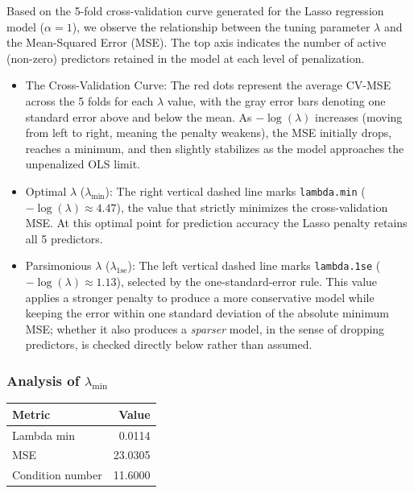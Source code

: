 \documentclass[
  11pt,
]{article}
\newcounter{none} %
\begin{document}
Based on the 5-fold cross-validation curve generated for the Lasso
regression model (\(\alpha = 1\)), we observe the relationship between
the tuning parameter \(\lambda\) and the Mean-Squared Error (MSE). The
top axis indicates the number of active (non-zero) predictors retained
in the model at each level of penalization.

\begin{itemize}
\item
  The Cross-Validation Curve: The red dots represent the average CV-MSE
  across the 5 folds for each \(\lambda\) value, with the gray error
  bars denoting one standard error above and below the mean. As
  \(-\log(\lambda)\) increases (moving from left to right, meaning the
  penalty weakens), the MSE initially drops, reaches a minimum, and then
  slightly stabilizes as the model approaches the unpenalized OLS limit.
\item
  Optimal \(\lambda\) (\(\lambda_{\text{min}}\)): The right vertical
  dashed line marks \texttt{lambda.min}
  (\(-\log(\lambda) \approx 4.47\)), the value that strictly minimizes
  the cross-validation MSE. At this optimal point for prediction
  accuracy the Lasso penalty retains all 5 predictors.
\item
  Parsimonious \(\lambda\) (\(\lambda_{\text{1se}}\)): The left vertical
  dashed line marks \texttt{lambda.1se}
  (\(-\log(\lambda) \approx 1.13\)), selected by the one-standard-error
  rule. This value applies a stronger penalty to produce a more
  conservative model while keeping the error within one standard
  deviation of the absolute minimum MSE; whether it also produces a
  \emph{sparser} model, in the sense of dropping predictors, is checked
  directly below rather than assumed.
\end{itemize}

\subsubsection{\texorpdfstring{Analysis of
\(\lambda_{\text{min}}\)}{Analysis of \textbackslash lambda\_\{\textbackslash text\{min\}\}}}\label{analysis-of-lambda_textmin}

{\def\LTcaptype{none} %
\begin{longtable}[]{@{}lr@{}}
\toprule\noalign{}
Metric & Value \\
\midrule\noalign{}
\endhead
\bottomrule\noalign{}
\endlastfoot
Lambda min & 0.0114 \\
MSE & 23.0305 \\
Condition number & 11.6000 \\
\end{longtable}
}
\end{document}
